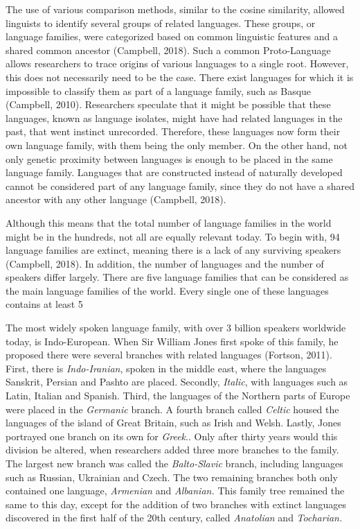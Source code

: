 The use of various comparison methods, similar to the cosine similarity, allowed linguists to identify several groups of related languages. These groups, or language families, were categorized based on common linguistic features and a shared common ancestor (Campbell, 2018). Such a common Proto-Language allows researchers to trace origins of various languages to a single root. However, this does not necessarily need to be the case. There exist languages for which it is impossible to classify them as part of a language family, such as Basque (Campbell, 2010). Researchers speculate that it might be possible that these languages, known as language isolates, might have had related languages in the past, that went instinct unrecorded. Therefore, these languages now form their own language family, with them being the only member. On the other hand, not only genetic proximity between languages is enough to be placed in the same language family. Languages that are constructed instead of naturally developed cannot be considered part of any language family, since they do not have a shared ancestor with any other language (Campbell, 2018). 

Although this means that the total number of language families in the world might be in the hundreds, not all are equally relevant today. To begin with, 94 language families are extinct, meaning there is a lack of any surviving speakers (Campbell, 2018). In addition, the number of languages and the number of speakers differ largely. There are five language families that can be considered as the main language families of the world. Every single one of these languages contains at least 5%

The most widely spoken language family, with over 3 billion speakers worldwide today, is Indo-European. When Sir William Jones first spoke of this family, he proposed there were several branches with related languages (Fortson, 2011). First, there is \textit{Indo-Iranian}, spoken in the middle east, where the languages Sanskrit, Persian and Pashto are placed. Secondly, \textit{Italic}, with languages such as Latin, Italian and Spanish. Third, the languages of the Northern parts of Europe were placed in the \textit{Germanic} branch. A fourth branch called \textit{Celtic} housed the languages of the island of Great Britain, such as Irish and Welsh. Lastly, Jones portrayed one branch on its own for \textit{Greek}.. Only after thirty years would this division be altered, when researchers added three more branches to the family. The largest new branch was called the \textit{Balto-Slavic} branch, including languages such as Russian, Ukrainian and Czech. The two remaining branches both only contained one language, \textit{Armenian} and \textit{Albanian.} This family tree remained the same to this day, except for the addition of two branches with extinct languages discovered in the first half of the 20th century, called \textit{Anatolian} and \textit{Tocharian.}  

